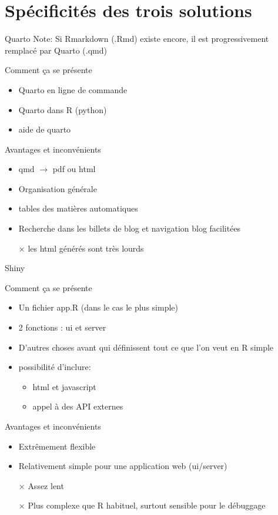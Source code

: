 \documentclass[pdftex,xcolor={table}]{beamer} %
\newcommand{\ra}[0]{$\rightarrow$ }
\newcommand{\cross}[0]{$\times$ } %
\begin{document}
\section{Spécificités des trois solutions}
  \begin{frame}{Quarto}
    Note: Si Rmarkdown (.Rmd) existe encore, il est progressivement remplacé par Quarto (.qmd)
    \begin{block}{Comment ça se présente}
      \begin{itemize}
        \item Quarto en ligne de commande
        \item Quarto dans R (python)
        \item aide de quarto
      \end{itemize}
    \end{block}
    \begin{block}{Avantages et inconvénients}
      \begin{itemize}
        \item qmd \ra pdf ou html
        \item Organisation générale 
        \item tables des matières automatiques
        \item Recherche dans les billets de blog et navigation blog facilitées
        \item[\cross] les html générés sont très lourds 
      \end{itemize}
    \end{block}
  \end{frame}
  \begin{frame}{Shiny}
    \begin{block}{Comment ça se présente}
      \begin{itemize}
        \item Un fichier app.R (dans le cas le plus simple)
        \item 2 fonctions : ui et server
        \item D'autres choses avant qui définissent tout ce que l'on veut en R simple
        \item possibilité d'inclure: 
          \begin{itemize}
            \item html et javascript
            \item appel à des API externes
          \end{itemize}
      \end{itemize}
    \end{block}
    \begin{block}{Avantages et inconvénients}
      \begin{itemize}
        \item Extrêmement flexible
        \item Relativement simple pour une application web (ui/server)
        \item[\cross] Assez lent
        \item[\cross] Plus complexe que R habituel, surtout sensible pour le débuggage
      \end{itemize}
    \end{block}
  \end{frame}
\end{document}
